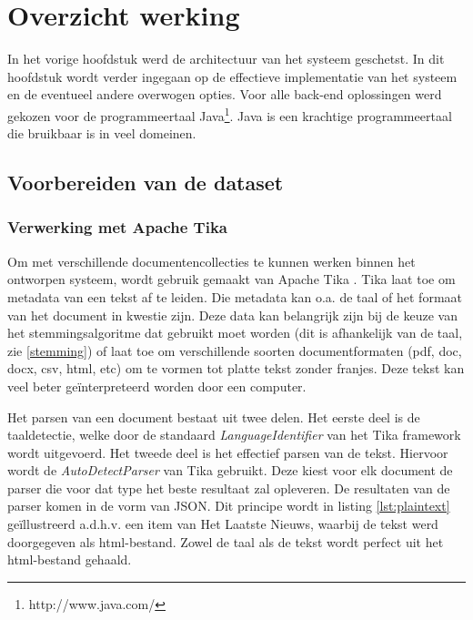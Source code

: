 \chapter{Overzicht werking}\label{hs:werking}

In het vorige hoofdstuk werd de architectuur van het systeem geschetst. In dit hoofdstuk wordt verder ingegaan op de effectieve implementatie van het systeem en de eventueel andere overwogen opties. Voor alle back-end oplossingen werd gekozen voor de programmeertaal Java\footnote{http://www.java.com/}. Java is een krachtige programmeertaal die bruikbaar is in veel domeinen. 

\section{Voorbereiden van de dataset}
\subsection{Verwerking met Apache Tika}
Om met verschillende documentencollecties te kunnen werken binnen het ontworpen systeem, wordt gebruik gemaakt van Apache Tika \cite{tika}. Tika laat toe om metadata van een tekst af te leiden. Die metadata kan o.a. de taal of het formaat van het document in kwestie zijn. Deze data kan belangrijk zijn bij de keuze van het stemmingsalgoritme dat gebruikt moet worden (dit is afhankelijk van de taal, zie \ref{stemming}) of laat toe om verschillende soorten documentformaten (pdf, doc, docx, csv, html, etc) om te vormen tot platte tekst zonder franjes. Deze tekst kan veel beter ge\"interpreteerd worden door een computer.

Het parsen van een document bestaat uit twee delen. Het eerste deel is de taaldetectie, welke door de standaard \textit{LanguageIdentifier} van het Tika framework wordt uitgevoerd. Het tweede deel is het effectief parsen van de tekst. Hiervoor wordt de \textit{AutoDetectParser} van Tika gebruikt. Deze kiest voor elk document de parser die voor dat type het beste resultaat zal opleveren.
De resultaten van de parser komen in de vorm van JSON. Dit principe wordt in listing \ref{lst:plaintext} ge\"illustreerd a.d.h.v. een item van Het Laatste Nieuws, waarbij de tekst werd doorgegeven als html-bestand. Zowel de taal als de tekst wordt perfect uit het html-bestand gehaald.

